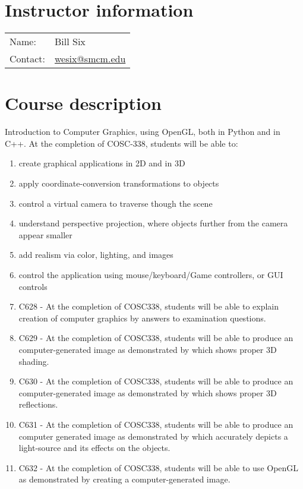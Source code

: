\documentclass[11pt,twocolumn]{article}
\title{\coursename}
\author{{\university}---{\semester}---{\classtimes}}
\date{}
\makeatletter
\newcommand{\myname}{Bill Six}
\newcommand{\myemail}{wesix@smcm.edu}
\makeatother
\begin{document}
\maketitle


\section{Instructor information}

\begin{tabular}{ll}
Name:&\myname \\
Contact:&\href{mailto:\myemail}{\myemail}\\
\end{tabular}

\section{Course description}

Introduction to Computer Graphics, using OpenGL, both in Python and in C++.
At the completion of COSC-338, students will be able to:

\begin{enumerate}
  \item create graphical applications in 2D and in 3D
  \item apply coordinate-conversion transformations to objects
  \item control a virtual camera to traverse though the scene
  \item understand perspective projection, where objects further from the camera appear smaller
  \item add realism via color, lighting, and images
  \item control the application using mouse/keyboard/Game controllers, or GUI controls
  \item C628 - At the completion of COSC338, students will be able to explain creation of computer graphics by answers to examination questions.
  \item C629 - At the completion of COSC338, students will be able to produce an computer-generated image as demonstrated by which shows proper 3D shading.
  \item C630 - At the completion of COSC338, students will be able to produce an computer-generated image as demonstrated by which shows proper 3D reflections.
  \item C631 - At the completion of COSC338, students will be able to produce an computer generated image as demonstrated by which accurately depicts a light-source and its effects on the objects.
  \item C632 - At the completion of COSC338, students will be able to use OpenGL as demonstrated by creating a computer-generated image.
\end{enumerate}
\end{document}
